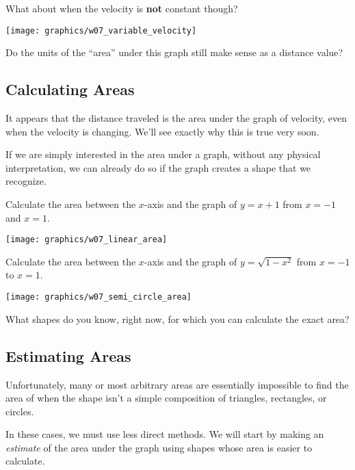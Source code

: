 \problem 
What about when the velocity is {\bf not} constant though?

\begin{center}
\texttt{[image: graphics/w07\_variable\_velocity]}
\end{center}

Do the units of the ``area'' under this graph still make sense as a
distance value?


\vfill
\newpage
\subsection*{Calculating Areas}

It appears that the distance traveled is the area under the graph of
velocity, even when the velocity is changing. We'll see exactly why
this is true very soon.

If we are simply interested in the area under a graph, without any
physical interpretation, we can already do so if the graph creates a
shape that we recognize.
\newpage

\problem Calculate the area between the $x$-axis and the graph of $y = x+1$ from $x=-1$ and $x=1$.

\hfill \texttt{[image: graphics/w07\_linear\_area]}
\newpage

\problem Calculate the area between the $x$-axis 
and the graph of $y = \sqrt{1 - x^{2}}$ from $x = -1$ to $x = 1$.

\hfill \texttt{[image: graphics/w07\_semi\_circle\_area]}

\vfill

\problem What shapes do you know, right now, for which you can
calculate the exact area?

\vfill

\newpage

\subsection*{Estimating Areas}

Unfortunately, many or most arbitrary areas are essentially impossible
to find the area of when the shape isn't a simple composition of
triangles, rectangles, or circles.

In these cases, we must use less direct methods.  We will start by
making an {\em estimate} of the area under the graph using shapes
whose area is easier to calculate.

